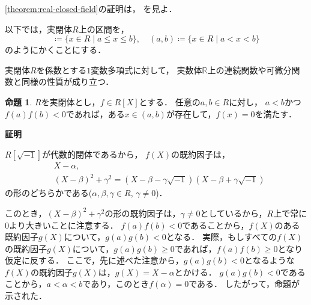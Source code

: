 \documentclass[uplatex, dvipdfmx]{jsarticle}
\makeatletter
\numberwithin{equation}{section}
\renewenvironment{proof}[1][\proofname]{\par
  \pushQED{\qed}%
  \normalfont \topsep6\p@\@plus6\p@\relax
  \trivlist
  \item\relax
  {\bfseries
  #1\@addpunct{.}}\hspace\labelsep\ignorespaces
}{
  \popQED\endtrivlist\@endpefalse
}
\newcommand{\R}{\mathbb{R}}
\theoremstyle{definition}
\newtheorem{proposition}[definition]{命題}
\renewcommand{\proofname}{\textbf{証明}}
\makeatother
\begin{document}
\cref{theorem:real-closed-field}の証明は，
\cite[Theorem 1.2.2]{MR1659509}を見よ．

以下では，実閉体$R$上の区間を，
\begin{equation}
     [a,b]\coloneqq\{x \in R \mid a \leq x \leq b\}, \quad (a,b)\coloneqq\{x \in R \mid a < x < b\}
\end{equation}
のようにかくことにする．

実閉体$R$を係数とする$1$変数多項式に対して，
実数体$\R$上の連続関数や可微分関数と同様の性質が成り立つ．

\begin{proposition}\label{proposition:intermediate}
     $R$を実閉体とし，$f \in R[X]$とする．
     任意の$a,b \in R$に対し，
     $a < b$かつ
     $f(a)f(b)<0$であれば，ある$x \in (a,b)$が存在して，$f(x)=0$を満たす．
\end{proposition}
\begin{proof}
     $R[\sqrt{-1}]$が代数的閉体であるから，
     $f(X)$の既約因子は，
     \begin{align}
          &X-\alpha, \\
          &(X-\beta)^2 + \gamma^2 = (X-\beta-\gamma\sqrt{-1})(X-\beta+\gamma\sqrt{-1})
     \end{align}
     の形のどちらかである($\alpha, \beta, \gamma \in R$, $\gamma \neq 0$)．

     このとき，$(X-\beta)^2 + \gamma^2$の形の既約因子は，$\gamma \neq 0$としているから，$R$上で常に$0$より大きいことに注意する．
     $f(a)f(b)<0$であることから，$f(X)$のある既約因子$g(X)$について，$g(a)g(b)<0$となる．
     実際，もしすべての$f(X)$の既約因子$g(X)$について，$g(a)g(b) \geq 0$であれば，$f(a)f(b)\geq0$となり仮定に反する．
     ここで，先に述べた注意から，$g(a)g(b)<0$となるような$f(X)$の既約因子$g(X)$は，$g(X) = X - \alpha$とかける．
     $g(a)g(b) < 0$であることから，$a<\alpha<b$であり，このとき$f(\alpha)=0$である．
     したがって，命題が示された．
\end{proof}
\end{document}
